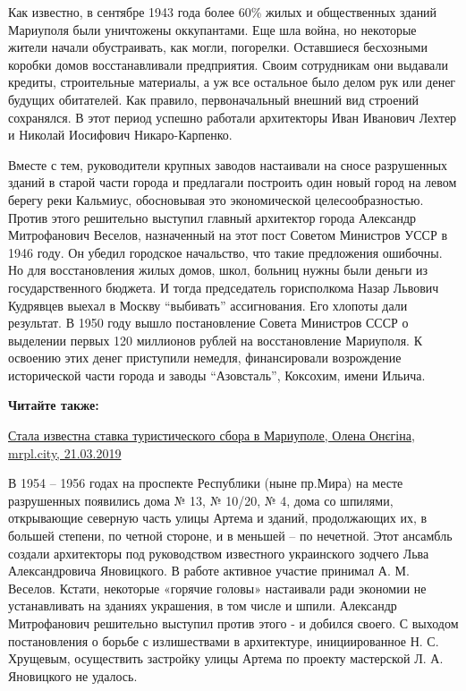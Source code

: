 Как известно, в сентябре 1943 года более 60\% жилых и общественных зданий
Мариуполя были уничтожены оккупантами. Еще шла война, но некоторые жители
начали обустраивать, как могли, погорелки. Оставшиеся бесхозными коробки домов
восстанавливали предприятия. Своим сотрудникам они выдавали кредиты,
строительные материалы, а уж все остальное было делом рук или денег будущих
обитателей. Как правило, первоначальный внешний вид строений сохранялся. В этот
период успешно работали архитекторы Иван Иванович Лехтер и Николай Иосифович
Никаро-Карпенко.

Вместе с тем, руководители крупных заводов настаивали на сносе разрушенных
зданий в старой части города и предлагали построить один новый город на левом
берегу реки Кальмиус, обосновывая это экономической целесообразностью. Против
этого решительно выступил главный архитектор города Александр Митрофанович
Веселов, назначенный на этот пост Советом Министров УССР в 1946 году. Он убедил
городское начальство, что такие предложения ошибочны. Но для восстановления
жилых домов, школ, больниц нужны были деньги из государственного бюджета. И
тогда председатель горисполкома Назар Львович Кудрявцев выехал в Москву
\enquote{выбивать} ассигнования. Его хлопоты дали результат. В 1950 году вышло
постановление Совета Министров СССР о выделении первых 120 миллионов рублей на
восстановление Мариуполя. К освоению этих денег приступили немедля,
финансировали возрождение исторической части города и заводы \enquote{Азовсталь},
Коксохим, имени Ильича.

\textbf{Читайте также:} 

\href{https://mrpl.city/news/view/stala-izvestna-stavka-turisticheskogo-sbora-v-mariupole}{%
Стала известна ставка туристического сбора в Мариуполе, Олена Онєгіна, mrpl.city, 21.03.2019}

В 1954 – 1956 годах на проспекте Республики (ныне пр.Мира) на месте
разрушенных появились дома № 13, № 10/20, № 4, дома со шпилями, открывающие
северную часть улицы Артема и зданий, продолжающих их, в большей степени, по
четной стороне, и в меньшей – по нечетной. Этот ансамбль создали архитекторы
под руководством известного украинского зодчего Льва Александровича Яновицкого.
В работе активное участие принимал А. М. Веселов. Кстати, некоторые «горячие
головы» настаивали ради экономии не устанавливать на зданиях украшения, в том
числе и шпили. Александр Митрофанович решительно выступил против этого  - и
добился своего. С выходом постановления о борьбе с излишествами в архитектуре,
инициированное Н. С. Хрущевым, осуществить застройку улицы Артема по проекту
мастерской Л. А. Яновицкого не удалось.

